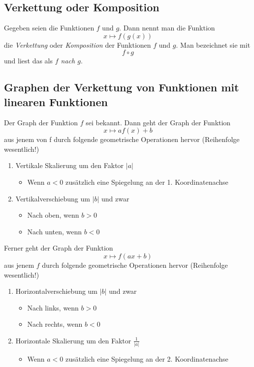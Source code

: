 \subsection{Verkettung oder Komposition}

Gegeben seien die Funktionen $f$ und $g$. Dann nennt man die Funktion
%
\begin{displaymath}
	x \mapsto f(g(x))
\end{displaymath}
%
die \textit{Verkettung} oder \textit{Komposition} der Funktionen $f$ und $g$. Man bezeichnet sie mit
%
\begin{displaymath}
	f \circ g
\end{displaymath}
%
und liest das als \textit{$f$ nach $g$}.


\subsection{Graphen der Verkettung von Funktionen mit linearen Funktionen}

Der Graph der Funktion $f$ sei bekannt. Dann geht der Graph der Funktion
%
\begin{displaymath}
	x \mapsto af(x) + b
\end{displaymath}
%
aus jenem von f durch folgende geometrische Operationen hervor (Reihenfolge wesentlich!)
\begin{enumerate}
	\item Vertikale Skalierung um den Faktor $|a|$
	\begin{itemize}
		\item Wenn $a < 0$ zusätzlich eine Spiegelung an der 1. Koordinatenachse
	\end{itemize}
	\item Vertikalverschiebung um $|b|$ und zwar
	\begin{itemize}
		\item Nach oben, wenn $b > 0$
		\item Nach unten, wenn $b < 0$
	\end{itemize}
\end{enumerate}

Ferner geht der Graph der Funktion
%
\begin{displaymath}
	x \mapsto f(ax + b)
\end{displaymath}
%
aus jenem $f$ durch folgende geometrische Operationen hervor (Reihenfolge wesentlich!)
\begin{enumerate}
	\item Horizontalverschiebung um $|b|$ und zwar
	\begin{itemize}
		\item Nach links, wenn $b > 0$
		\item Nach rechts, wenn $b < 0$
	\end{itemize}
	\item Horizontale Skalierung um den Faktor $\displaystyle\frac{1}{|a|}$
	\begin{itemize}
		\item Wenn $a < 0$ zusätzlich eine Spiegelung an der 2. Koordinatenachse	
	\end{itemize}
\end{enumerate}


